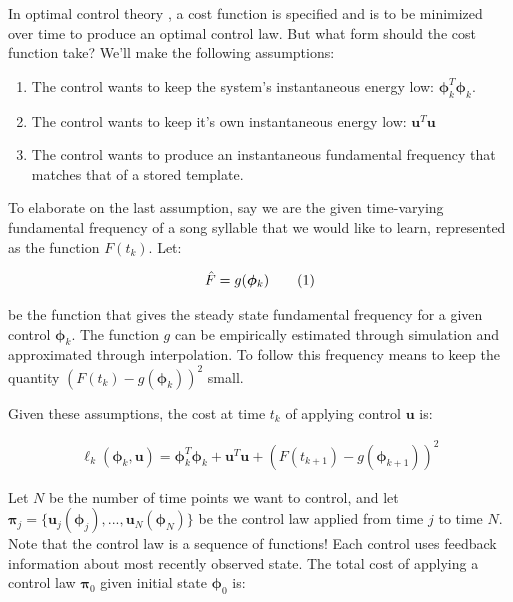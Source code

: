 \documentclass{article} %
\newcommand\numberthis{\addtocounter{equation}{1}\tag{\theequation}}
\begin{document}
In optimal control theory \cite{Todorov2002}, a cost function is specified and is to be minimized over time to
produce an optimal control law. But what form should the cost function take? We'll make
the following assumptions:

\begin{enumerate}

\item The control wants to keep the system's instantaneous energy low: $\bm{\phi}_k^T \bm{\phi}_k$.
\item The control wants to keep it's own instantaneous energy low: $\bm{u}^T \bm{u}$ 
\item The control wants to produce an instantaneous fundamental frequency that matches that of a stored template.

\end{enumerate}

To elaborate on the last assumption, say we are the given time-varying fundamental frequency
of a song syllable that we would like to learn, represented as the function $F(t_k)$. Let:

\begin{align*}
\hat{F} = g(\bm{\phi}_k) \numberthis \label{eq_ff}
\end{align*}

be the function that gives the steady state fundamental
frequency for a given control $\bm{\phi}_k$. The function $g$ can be empirically
estimated through simulation and approximated through interpolation. To follow this
frequency means to keep the quantity $\left( F(t_k) - g(\bm{\phi}_k) \right) ^2$ small.

Given these assumptions, the cost at time $t_k$ of applying control $\bm{u}$ is:

\begin{align*}
\ell_k \left( \bm{\phi}_{k}, \bm{u} \right) = \bm{\phi}_{k}^T \bm{\phi}_{k} +
							\bm{u}^T \bm{u} +
							\left( F(t_{k+1}) - g(\bm{\phi}_{k+1}) \right) ^2
\end{align*}

Let $N$ be the number of time points we want to control, and let
$\bm{\pi}_j=\{ \bm{u}_j(\bm{\phi}_{j}), ..., \bm{u}_N(\bm{\phi}_{N}) \}$ be the control
law applied from time $j$ to time $N$. Note that the control law is a sequence of
functions! Each control uses feedback information about most recently observed state.
The total cost of applying a control law $\bm{\pi}_0$ given initial state
$\bm{\phi}_0$ is:
\end{document}
